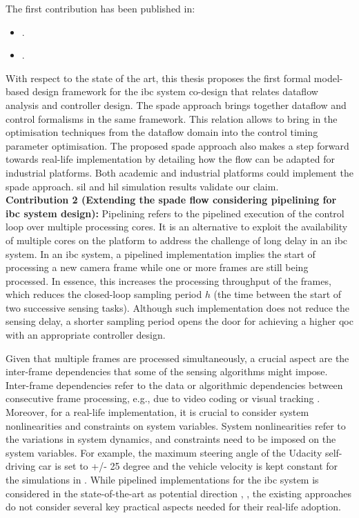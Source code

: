 The first contribution has been published in:
\begin{itemize}
    \item {}.
    \item {}.
\end{itemize}
With respect to the state of the art, this thesis proposes the first formal model-based design framework for the \gls{ibc} system co-design that relates dataflow analysis and controller design. 
The \gls{spade} approach brings together dataflow and control formalisms in the same framework.
This relation allows to bring in the optimisation techniques from the dataflow domain into the control timing parameter optimisation.
The proposed \gls{spade} approach also makes a step forward towards real-life implementation by detailing how the flow can be adapted for industrial platforms. Both academic and industrial platforms could implement the \gls{spade} approach. \gls{sil} and \gls{hil} simulation results validate our claim.
\\[1ex]
\noindent
\textbf{Contribution 2 (Extending the \gls{spade} flow considering pipelining for \gls{ibc} system design):}
Pipelining refers to the pipelined execution of the control loop over multiple processing cores. It is an alternative to exploit the availability of multiple cores on the platform to address the challenge of long delay in an \gls{ibc} system. In an \gls{ibc} system, a pipelined implementation implies the start of processing a new camera frame while one or more frames are still being processed. In essence, this increases the processing throughput of the frames, which reduces the closed-loop sampling period $h$ (the time between the start of two successive sensing tasks). Although such implementation does not reduce the sensing delay, a shorter sampling period opens the door for achieving a higher \gls{qoc} with an appropriate controller design. 

Given that multiple frames are processed simultaneously, a crucial aspect are the inter-frame dependencies that some of the sensing algorithms might impose. Inter-frame dependencies refer to the data or algorithmic dependencies between consecutive frame processing, e.g., due to video coding \cite{li2015lagrangian} or visual tracking \cite{smeulders2013visual}. Moreover, for a real-life implementation, it is crucial to consider system nonlinearities and constraints
on system variables. System nonlinearities refer to the variations in system dynamics, and constraints need to be imposed on the system variables. For example, the maximum steering angle of the Udacity self-driving car is set to +/- 25 degree \cite{tian2018deeptest} and the vehicle velocity is kept constant for the simulations in \cite{kosecka1997vision}. While pipelined implementations for the \gls{ibc} system is considered in the state-of-the-art as potential direction \cite{medina2019designing}, \cite{krautgartner1998performance}, the existing approaches do not consider several key practical aspects needed for their real-life adoption. 


